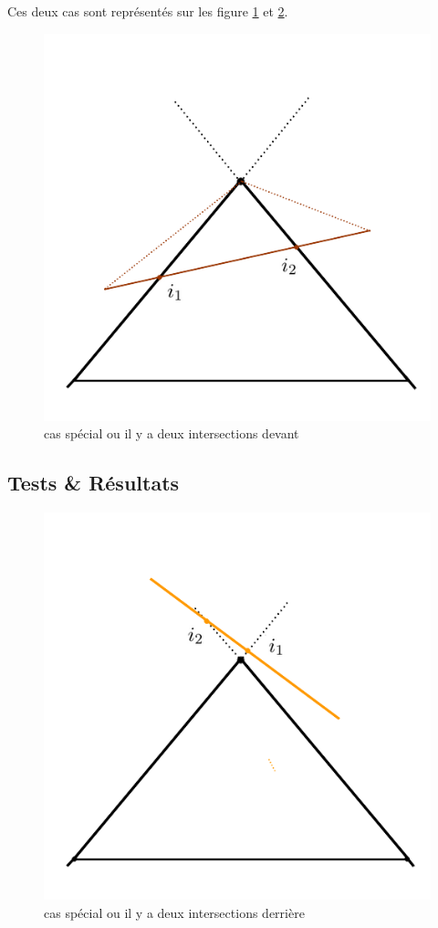 \documentclass[11pt,a4paper]{article}
\begin{document}
Ces deux cas sont représentés sur les figure \ref{exp_5} et \ref{exp_6}.

\begin{figure}[H]
\centering
\includegraphics[scale=0.5]{casSpecial2.png}
\caption{cas spécial ou il y a deux intersections devant}
\label{exp_5}
\end{figure}
\subsection{Tests \& Résultats}

\begin{figure}[!h]
\centering
\includegraphics[scale=0.5]{casSpecial3.png}
\caption{cas spécial ou il y a deux intersections derrière}
\label{exp_6}
\end{figure}
\end{document}
